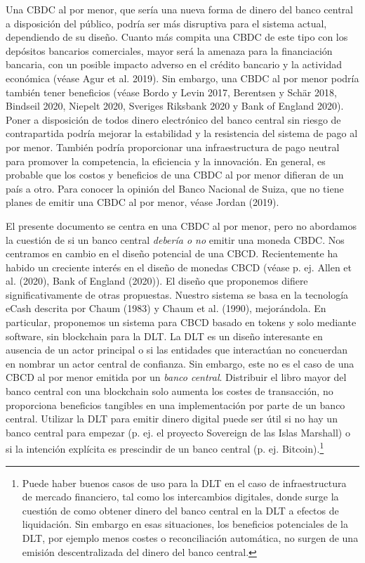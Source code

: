 \documentclass[10pt,spanish]{article}
\begin{document}
Una CBDC al por menor, que sería una nueva forma de dinero del banco
central a disposición del público, podría ser más disruptiva para el
sistema actual, dependiendo de su diseño. Cuanto más compita una CBDC de
este tipo con los depósitos bancarios comerciales, mayor será la amenaza
para la financiación bancaria, con un posible impacto adverso en el
crédito bancario y la actividad económica (véase Agur et al. 2019). Sin
embargo, una CBDC al por menor podría también tener beneficios (véase
Bordo y Levin 2017, Berentsen y Schär 2018, Bindseil 2020, Niepelt 2020,
Sveriges Riksbank 2020 y Bank of England 2020). Poner a disposición de
todos dinero electrónico del banco central sin riesgo de contrapartida
podría mejorar la estabilidad y la resistencia del sistema de pago al
por menor. También podría proporcionar una infraestructura de pago
neutral para promover la competencia, la eficiencia y la innovación. En
general, es probable que los costos y beneficios de una CBDC al por
menor difieran de un país a otro. Para conocer la opinión del Banco
Nacional de Suiza, que no tiene planes de emitir una CBDC al por menor,
véase Jordan (2019).

El presente documento se centra en una CBDC al por menor, pero no
abordamos la cuestión de si un banco central \emph{debería o no} emitir
una moneda CBDC. Nos centramos en cambio en el diseño potencial de una
CBCD. Recientemente ha habido un creciente interés en el diseño de
monedas CBCD (véase p. ej. Allen et al. (2020), Bank of England (2020)).
El diseño que proponemos difiere significativamente de otras propuestas.
Nuestro sistema se basa en la tecnología eCash descrita por Chaum (1983)
y Chaum et al. (1990), mejorándola. En particular, proponemos un sistema
para CBCD basado en tokens y solo mediante software, sin blockchain para
la DLT. La DLT es un diseño interesante en ausencia de un actor
principal o si las entidades que interactúan no concuerdan en nombrar un
actor central de confianza. Sin embargo, este no es el caso de una CBCD
al por menor emitida por un \emph{banco central}. Distribuir el libro
mayor del banco central con una blockchain solo aumenta los costes de
transacción, no proporciona beneficios tangibles en una implementación
por parte de un banco central. Utilizar la DLT para emitir dinero
digital puede ser útil si no hay un banco central para empezar (p. ej.
el proyecto Sovereign de las Islas Marshall) o si la intención explícita
es prescindir de un banco central (p. ej. Bitcoin).\footnote{Puede haber
buenos casos de uso para la DLT en el caso de infraestructura de
mercado financiero, tal como los intercambios digitales, donde surge la
cuestión de como obtener dinero del banco central en la DLT a efectos de
liquidación. Sin embargo en esas situaciones, los beneficios potenciales
de la DLT, por ejemplo menos costes o reconciliación automática, no surgen
de una emisión descentralizada del dinero del banco central.}
\end{document}
